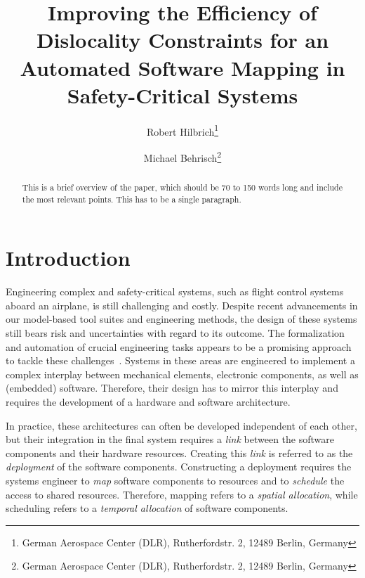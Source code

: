\documentclass[english,biblatex]{lni}
\begin{document}
\title[Improving the Efficiency of Dislocality Constraints]{Improving the Efficiency of Dislocality Constraints for an Automated Software Mapping in Safety-Critical Systems}
\author[Robert Hilbrich \and Michael Behrisch]
{Robert Hilbrich\footnote{German Aerospace Center (DLR), Rutherfordstr. 2, 12489 Berlin,
Germany } \and
Michael Behrisch\footnote{German Aerospace Center (DLR), Rutherfordstr. 2, 12489 Berlin,
Germany }}


\maketitle

\begin{abstract}
This is a brief overview of the paper, which should be 70 to 150 words long and
include the most relevant points. This has to be a single paragraph.
\end{abstract}




\section{Introduction}

Engineering complex and safety-critical systems, such as flight control systems aboard an airplane, is still challenging and costly.
Despite recent advancements in our model-based tool suites and engineering methods, the design of these systems still bears risk and uncertainties with regard to its outcome.
The formalization and automation of crucial engineering tasks appears to be a promising approach to tackle these challenges~\cite{Chapman2007}.
Systems in these areas are engineered to implement a complex interplay between mechanical elements, electronic components, as well as (embedded) software.
Therefore, their design has to mirror this interplay and requires the development of a hardware and software architecture.

In practice, these architectures can often be developed independent of each other, but their integration in the final system requires a \emph{link} between the software components and their hardware resources.     
Creating this \emph{link} is referred to as the \emph{deployment} of the software components.
Constructing a deployment requires the systems engineer to \emph{map} software components to resources and to \emph{schedule} the access to shared resources.
Therefore, mapping refers to a \emph{spatial allocation}, while scheduling refers to a \emph{temporal allocation} of software components.
\end{document}
